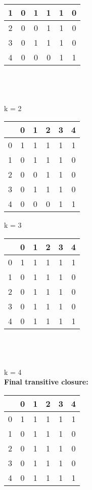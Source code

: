 \documentclass[11pt]{article}
\begin{document}
\begin{enumerate}
\begin{multicols*}{2}
\begin{tabular}{c || c | c | c | c | c}
           1 & 0 & 1 & 1 & 1 & 0    \\ \hline 
           2 & 0 & 0 & 1 & 1 & 0    \\ \hline 
           3 & 0 & 1 & 1 & 1 & 0    \\ \hline 
           4 & 0 & 0 & 0 & 1 & 1    \\ \hline 
        \end{tabular}
        \\ \\ \\
        k = 2   \\
        \begin{tabular}{c || c | c | c | c | c}
            & 0 & 1 & 2 & 3 & 4    \\ \hline \hline
           0 & 1 & 1 & 1 & 1 & 1    \\ \hline 
           1 & 0 & 1 & 1 & 1 & 0    \\ \hline 
           2 & 0 & 0 & 1 & 1 & 0    \\ \hline 
           3 & 0 & 1 & 1 & 1 & 0    \\ \hline 
           4 & 0 & 0 & 0 & 1 & 1    \\ \hline 
        \end{tabular}
        \vfill
        \columnbreak
        k = 3   \\
        \begin{tabular}{c || c | c | c | c | c}
            & 0 & 1 & 2 & 3 & 4    \\ \hline \hline
           0 & 1 & 1 & 1 & 1 & 1    \\ \hline 
           1 & 0 & 1 & 1 & 1 & 0    \\ \hline 
           2 & 0 & 1 & 1 & 1 & 0    \\ \hline 
           3 & 0 & 1 & 1 & 1 & 0    \\ \hline 
           4 & 0 & 1 & 1 & 1 & 1    \\ \hline 
        \end{tabular}
        \\ \\ \\
        k = 4   \\
        \textbf{Final transitive closure: }  \\
        \begin{tabular}{c || c | c | c | c | c}
            & 0 & 1 & 2 & 3 & 4    \\ \hline \hline
           0 & 1 & 1 & 1 & 1 & 1    \\ \hline 
           1 & 0 & 1 & 1 & 1 & 0    \\ \hline 
           2 & 0 & 1 & 1 & 1 & 0    \\ \hline 
           3 & 0 & 1 & 1 & 1 & 0    \\ \hline 
           4 & 0 & 1 & 1 & 1 & 1    \\ \hline 
        \end{tabular}
        \end{multicols*}


\end{enumerate}
\end{document}
